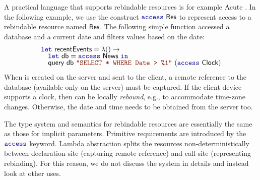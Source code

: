 A practical language that supports rebindable resources is for example Acute \cite{app-distributed-acute}.
In the following example, we use the construct $\kvd{access}~\ident{Res}$ to represent
access to a rebindable resource named $\textnormal{\sffamily Res}$. The following simple function accessed
a database and a current date and filters values based on the date:
%
\begin{equation*}
\begin{array}{l}
\kvd{let}~\ident{recentEvents} = \lambda () \rightarrow\\[-0.25em]
\quad\kvd{let}~\ident{db} = \kvd{access}~\ident{News}~\kvd{in}\\[-0.25em]
\quad\ident{query}~\ident{db}~\str{SELECT * WHERE Date > \%1}~(\kvd{access}~\ident{Clock})
\end{array}
\end{equation*}
%
When  is created on the server and sent to the client, a remote reference to 
the database (available only on the server) must be captured. If the client device supports a 
clock, then  can be locally \emph{rebound}, e.g., to accommodate time-zone changes. 
Otherwise, the date and time needs to be obtained from the server too.

The type system and semantics for rebindable resources are essentially the same as those for
implicit parameters. Primitive requirements are introduced by the $\kvd{access}$ keyword. 
Lambda abstraction splits the resources non-deterministically between declaration-site 
(capturing remote reference) and call-site (representing rebinding). For this reason, we do not
discuss the system in details and instead look at other uses.


